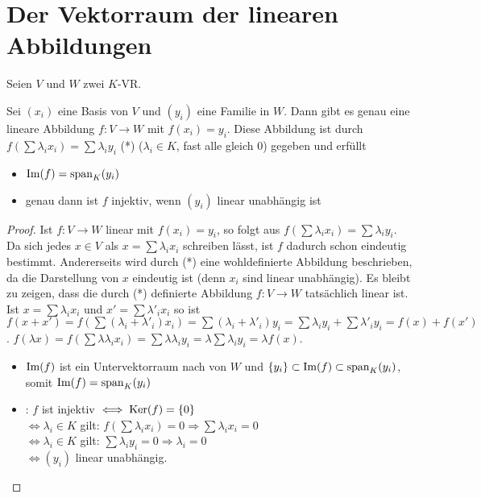 \section{Der Vektorraum der linearen Abbildungen}

Seien $V$ und $W$ zwei $K$-VR.

\begin{proposition}
	Sei $(x_i)$ eine Basis von $V$ und $(y_i)$ eine Familie in $W$. Dann gibt es genau eine lineare 
	Abbildung $f:V\to W$ mit $f(x_i)=y_i$. Diese Abbildung ist durch $f(\sum \lambda_ix_i)=\sum \lambda_iy_i$ 
	(*) ($\lambda_i\in K$, fast alle gleich 0) gegeben und erfüllt
	\begin{itemize}
		\item $\operatorname{Im}(f)=\operatorname{span}_K(y_i)$
		\item genau dann ist $f$ injektiv, wenn $(y_i)$ linear unabhängig ist
	\end{itemize}
\end{proposition}
\begin{proof}
	Ist $f:V\to W$ linear mit $f(x_i)=y_i$, so folgt aus  $f(\sum \lambda_ix_i)=\sum \lambda_iy_i$. Da sich jedes 
	$x\in V$ als $x=\sum  \lambda_ix_i$ schreiben lässt, ist $f$ dadurch schon eindeutig bestimmt. Andererseits wird 
	durch (*) eine wohldefinierte Abbildung beschrieben, da die Darstellung von $x$ eindeutig ist (denn $x_i$ sind 
	linear unabhängig). Es bleibt zu zeigen, dass die durch (*) definierte Abbildung $f:V\to W$ tatsächlich linear ist. 
	Ist $x=\sum \lambda_ix_i$ und $x'=\sum \lambda'_ix_i$ so ist $f(x+x')=f(\sum (\lambda_i+\lambda'_i)x_i)=
	\sum (\lambda_i+\lambda'_i)y_i=\sum \lambda_iy_i+\sum \lambda'_iy_i=f(x)+f(x')$. $f(\lambda x)=f(\sum \lambda
	\lambda_ix_i)=\sum \lambda\lambda_iy_i=\lambda\sum\lambda_iy_i=\lambda f(x)$.
	\begin{itemize}
		\item $\operatorname{Im}(f)$ ist ein Untervektorraum nach  von $W$ und $\{y_i\}\subset \operatorname{Im}(f)\subset \operatorname{span}_K(y_i)$, somit $\operatorname{Im}(f)=\operatorname{span}_K(y_i)$
		\item {}: $f$ ist injektiv $\iff \operatorname{Ker}(f)=\{0\}$ \\ 
		$\iff \lambda_i\in K$ gilt: $f(\sum \lambda_ix_i)=0\Rightarrow \sum \lambda_ix_i=0$ \\ 
		$\iff \lambda_i\in K$ gilt: $\sum\lambda_iy_i=0\Rightarrow \lambda_i=0$ \\ 
		$\iff (y_i)$ linear unabhängig.
	\end{itemize}
\end{proof}

